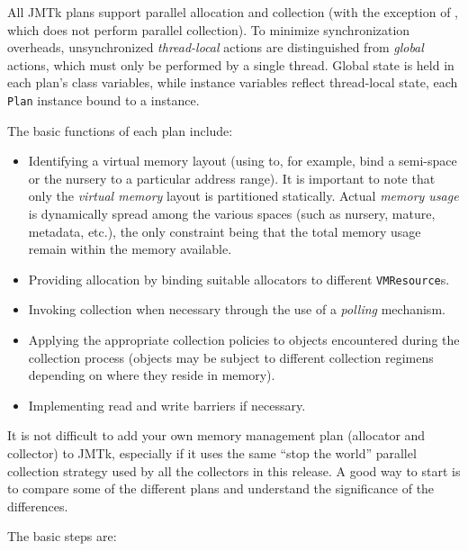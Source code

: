 All JMTk plans support parallel allocation and collection (with the
exception of , which does not perform parallel
collection).  To minimize synchronization overheads, unsynchronized
\emph{thread-local} actions are distinguished from \emph{global}
actions, which must only be performed by a single thread.  Global
state is held in each plan's class variables, while instance variables
reflect thread-local state, each \texttt{Plan} instance bound to a
 instance.

The basic functions of each plan include:
\begin{itemize}
\item Identifying a virtual memory layout (using
   to, for example, bind a
  semi-space or the nursery to a particular address range).  It is
  important to note that only the \emph{virtual memory} layout is
  partitioned statically.  Actual \emph{memory usage} is dynamically
  spread among the various spaces (such as nursery, mature, metadata,
  etc.), the only constraint being that the total memory usage remain
  within the memory available.
\item Providing allocation by binding suitable allocators to different
  \texttt{VMResource}s.
\item Invoking collection when necessary through the use of a
  \emph{polling} mechanism.
\item Applying the appropriate collection policies to objects
  encountered during the collection process (objects may be subject to
  different collection regimens depending on where they reside in
  memory).
\item Implementing read and write barriers if necessary.
\end{itemize}

It is not difficult to add your own memory management plan (allocator
and collector) to JMTk, especially if it uses the same ``stop the
world'' parallel collection strategy used by all the collectors in
this release.  A good way to start is to compare some of the different
plans and understand the significance of the differences.

The basic steps are:

